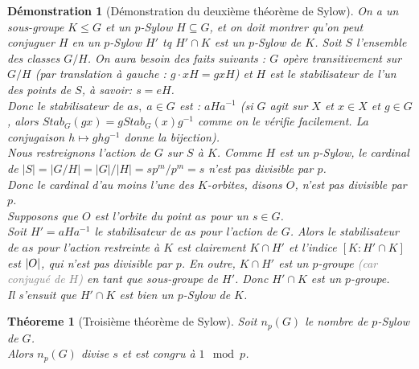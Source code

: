 \documentclass[a4paper, oneside]{report}
\theoremstyle{break}
\newtheorem{thm}{Théoreme}[section] %
\newtheorem*{demonstration}{Démonstration}
\newcommand{\sg}{sous-groupe }
\newcommand{\gray}[1]{\textcolor{gray}{#1}}
\DeclarePairedDelimiter\abs{\lvert}{\rvert}%
\begin{document}
\begin{demonstration}[Démonstration du deuxième théorème de Sylow]
On a un sous-groupe $K \leq G$ et un $p$-Sylow $H \subseteq G$, et on doit montrer qu'on peut conjuguer $H$ en un $p$-Sylow $H'$ tq $H' \cap K$ est un $p$-Sylow de $K$.
\medbreak
Soit $S$ l'ensemble des classes $G/H$. On aura besoin des faits suivants : $G$ opère transitivement sur $G/H$ (par translation à gauche : $g\cdot xH = gxH$) et $H$ est le stabilisateur de l'un des points de $S$, à savoir: $s = eH$.\\
Donc le stabilisateur de $as, \; a \in G$ est : $aHa^{-1}$ (si $G$ agit sur $X$ et $x\in X$ et $g\in G$, alors $Stab_G(gx)=gStab_G(x)g^{-1}$ comme on le vérifie facilement. La conjugaison $h\mapsto ghg^{-1}$ donne la bijection).\\
Nous restreignons l'action de $G$ sur $S$ à $K$. Comme $H$ est un $p$-Sylow, le cardinal de $|S| = |G/H| = |G|/|H| = sp^m / p^m = s$ n'est pas divisible par $p$.\\
Donc le cardinal d'au moins l'une des $K$-orbites, disons $O$, n'est pas divisible par $p$.\\
Supposons que $O$ est l'orbite du point $as$ pour un $s \in G$.\\
Soit $H' = aHa^{-1}$ le stabilisateur de $as$ pour l'action de $G$. Alors le stabilisateur de $as$ pour l'action restreinte à $K$ est clairement $K \cap H'$ et l'indice $[K : H' \cap K]$ est $\abs{O}$, qui n'est pas divisible par $p$. En outre, $K\cap H'$ est un $p$-groupe \gray{(car conjugué de $H$)} en tant que \sg de $H'$. Donc $H' \cap K$ est un $p$-groupe.\\
Il s'ensuit que $H' \cap K$ est bien un $p$-Sylow de $K$.
\end{demonstration}

\begin{thm}[Troisième théorème de Sylow]
Soit $n_p(G)$ le nombre de $p$-Sylow de $G$.\\
Alors $n_p(G)$ divise $s$ et est congru à $1\mod p$.
\end{thm}
\end{document}
